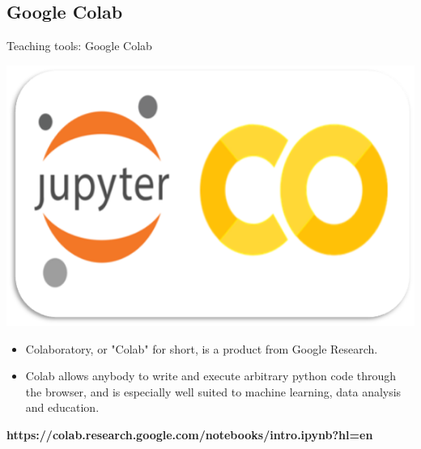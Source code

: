\documentclass[11pt]{beamer}
\begin{document}
\subsection{Google Colab}
%
\begin{frame}{Teaching tools: Google Colab}
	\noindent\begin{minipage}{0.5\textwidth}
		\includegraphics[width=\linewidth]{../05-pictures/lesson-1-1_pic_31.PNG}
	\end{minipage}%
	\hfill%
	\begin{minipage}{0.5\textwidth}
		\begin{itemize}
			\item Colaboratory, or "Colab" for short, is a product from Google Research. \item Colab allows anybody to write and execute arbitrary python code through the browser, and is especially well suited to machine learning, data analysis and education. 
		\end{itemize}
	\end{minipage}
\vfill
\footnotesize{\textbf{https://colab.research.google.com/notebooks/intro.ipynb?hl=en}}
\end{frame}
\end{document}
